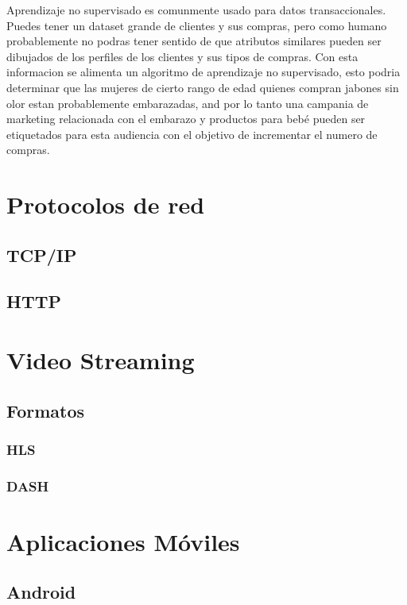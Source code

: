 Aprendizaje no supervisado es comunmente usado para datos transaccionales. Puedes tener un dataset grande de clientes y sus compras, pero como humano probablemente no podras tener sentido de que atributos similares pueden ser dibujados de los perfiles de los clientes y sus tipos de compras. Con esta informacion se alimenta un algoritmo de aprendizaje no supervisado, esto podria determinar que las mujeres de cierto rango de edad quienes compran jabones sin olor estan probablemente embarazadas, and por lo tanto una campania de marketing relacionada con el embarazo y productos para bebé pueden ser etiquetados para esta audiencia con el objetivo de incrementar el numero de compras.\\

\section{Protocolos de red}

\subsection{TCP/IP}

\subsection{HTTP}

\section{Video Streaming}

\subsection{Formatos}

\subsubsection{HLS}

\subsubsection{DASH}

\section{Aplicaciones Móviles}

\subsection{Android}

